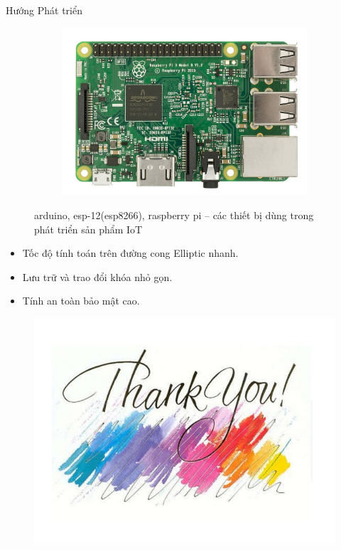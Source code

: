 \documentclass[compress]{beamer}
\begin{document}
\begin{frame}{Hướng Phát triển}
\begin{figure}[h]
\begin{subfigure}{.3\textwidth}
  \label{fig:sfig2}
\end{subfigure}
\begin{subfigure}{.3\textwidth}
  \centering
  \includegraphics[width=1\linewidth]{../ras.jpg}
  \label{fig:sfig2}
\end{subfigure}
\caption{arduino, esp-12(esp8266), raspberry pi – các thiết bị dùng trong phát triển sản phẩm IoT} \label{h6.3}
\end{figure}
\begin{itemize}
\item Tốc độ tính toán trên đường cong Elliptic nhanh.
\item Lưu trữ và trao đổi khóa nhỏ gọn.
\item Tính an toàn bảo mật cao.
\end{itemize}
\end{frame}
\begin{frame}
\begin{center}
\begin{figure}
\centering
\includegraphics[width=1\linewidth]{../thanks.jpg}
\end{figure}
\end{center}
\end{frame}
\end{document}
